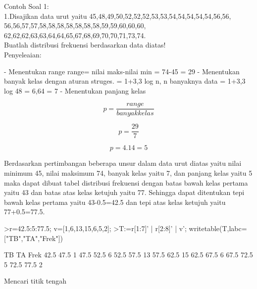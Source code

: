\documentclass[a4paper,10pt]{article}
\begin{document}
\begin{eulernotebook}
\begin{eulercomment}
Contoh Soal 1:\\
1.Disajikan data urut yaitu
45,48,49,50,52,52,52,53,53,54,54,54,54,54,56,56,
56,56,57,57,58,58,58,58,58,58,58,59,59,60,60,60,
62,62,62,63,63,64,64,65,67,68,69,70,70,71,73,74.\\
Buatlah distribusi frekuensi berdasarkan data diatas!\\
Penyeleaian:\\
\end{eulercomment}
\begin{eulerttcomment}
         - Menentukan range
           range= nilai maks-nilai min
                = 74-45
                = 29
         - Menentukan banyak kelas dengan aturan
           struges.
           = 1+3,3 log n, n banyaknya data
           = 1+3,3 log 48
           = 6,64
           = 7
         - Menentukan panjang kelas
\end{eulerttcomment}
\begin{eulerformula}
\[
p=\frac {range}{banyak kelas}
\]
\end{eulerformula}
\begin{eulerformula}
\[
p=\frac {29}{7}
\]
\end{eulerformula}
\begin{eulerformula}
\[
p= 4.14=5
\]
\end{eulerformula}
\begin{eulercomment}
Berdasarkan pertimbangan beberapa unsur dalam data urut diatas yaitu
nilai minimum 45, nilai maksimum 74, banyak kelas yaitu 7, dan panjang
kelas yaitu 5 maka dapat dibuat tabel distribusi frekuensi dengan
batas bawah kelas pertama yaitu 43 dan batas atas kelas ketujuh yaitu
77. Sehingga dapat ditentukan tepi bawah kelas pertama yaitu
43-0.5=42.5 dan tepi atas kelas ketujuh yaitu 77+0.5=77.5.
\end{eulercomment}
\begin{eulerprompt}
>r=42.5:5:77.5; v=[1,6,13,15,6,5,2];
>T:=r[1:7]' | r[2:8]' | v'; writetable(T,labc=["TB","TA","Frek"])
\end{eulerprompt}
\begin{euleroutput}
          TB        TA      Frek
        42.5      47.5         1
        47.5      52.5         6
        52.5      57.5        13
        57.5      62.5        15
        62.5      67.5         6
        67.5      72.5         5
        72.5      77.5         2
\end{euleroutput}
\begin{eulercomment}
Mencari titik tengah 
\end{eulercomment}

\end{eulernotebook}
\end{document}
